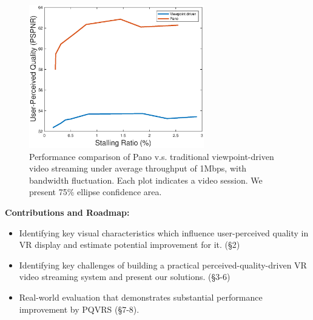     \begin{figure}
  \centering
  \includegraphics[width=3in]{images/first_image.eps}
  \caption{Performance comparison of Pano v.s. traditional viewpoint-driven video streaming under average throughput of 1Mbps, with bandwidth fluctuation. Each plot indicates a video session. We present 75\% ellipse confidence area.}
  \label{first_image}
  \end{figure}

\textbf{Contributions and Roadmap:}
\begin{itemize}
\item Identifying key visual characteristics which influence user-perceived quality in VR display and estimate potential improvement for it. (\S 2)
\item Identifying key challenges of building a practical perceived-quality-driven VR video streaming system and present our solutions. (\S 3-6)
\item Real-world evaluation that demonstrates substantial performance improvement by PQVRS (\S 7-8).
\end{itemize}
